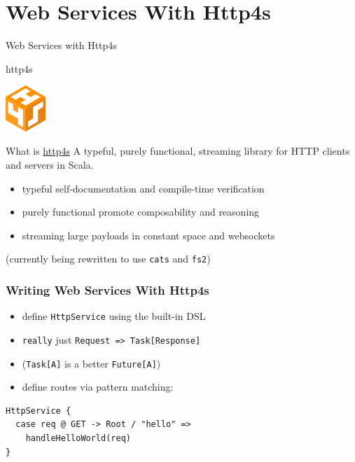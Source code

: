 \documentclass{beamer}
\begin{document}
\section{Web Services With Http4s}

\begin{frame}
  \begin{center}
    \Huge Web Services with Http4s
  \end{center}
\end{frame}

\begin{frame}{http4s}
  \begin{center}
    \includegraphics[width=15mm]{../pics/http4s.png}
  \end{center}

  \begin{block}{What is \hyperlink{http://http4s.org/}{http4s}}
    A typeful, purely functional, streaming library for HTTP
    clients and servers in Scala.
  \end{block}
  \begin{itemize}
  \item typeful \textemdash{} self-documentation and compile-time verification
  \item purely functional \textemdash{} promote composability and reasoning
  \item streaming \textemdash{} large payloads in constant space and
    websockets
  \end{itemize}
  \begin{center}
    \alert{(currently being rewritten to use \texttt{cats} and \texttt{fs2})}
  \end{center}

\end{frame}

\begin{frame}[fragile]
  \frametitle{Writing Web Services With Http4s}
  \begin{itemize}
  \item define \texttt{HttpService} using the built-in DSL
  \item \texttt{really} just \texttt{Request => Task[Response]}
  \item (\texttt{Task[A]} is a better \texttt{Future[A]})
  \item define routes via pattern matching:
  \end{itemize}
\begin{verbatim}
HttpService {
  case req @ GET -> Root / "hello" =>
    handleHelloWorld(req)
}
\end{verbatim}
\end{frame}
\end{document}

